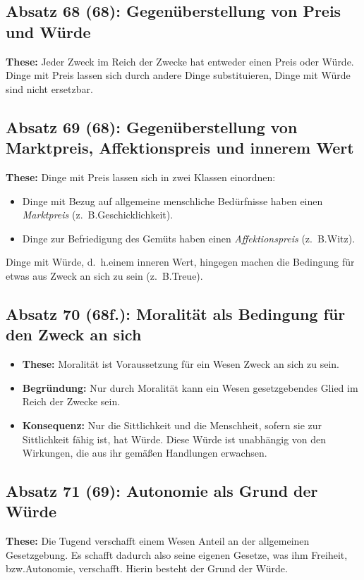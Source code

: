 \documentclass{llncs}
\begin{document}
\subsection*{Absatz 68 (68): Gegenüberstellung von Preis und Würde}

\textbf{These:} Jeder Zweck im Reich der Zwecke hat entweder einen Preis oder Würde.
Dinge mit Preis lassen sich durch andere Dinge substituieren, Dinge mit Würde sind nicht ersetzbar.

\subsection*{Absatz 69 (68): Gegenüberstellung von Marktpreis, Affektionspreis und innerem Wert}

\textbf{These:} Dinge mit Preis lassen sich in zwei Klassen einordnen:
\begin{itemize}
	\item Dinge mit Bezug auf allgemeine menschliche Bedürfnisse haben einen \textit{Marktpreis} (z.~B.\@ Geschicklichkeit).
	\item Dinge zur Befriedigung des Gemüts haben einen \textit{Affektionspreis} (z.~B.\@ Witz).
\end{itemize}
Dinge mit Würde, d.~h.\@ einem inneren Wert, hingegen machen die Bedingung für etwas aus Zweck an sich zu sein (z.~B.\@ Treue).

\subsection*{Absatz 70 (68f.): Moralität als Bedingung für den Zweck an sich}

\begin{itemize}
	\item \textbf{These:} Moralität ist Voraussetzung für ein Wesen Zweck an sich zu sein.
	\item \textbf{Begründung:} Nur durch Moralität kann ein Wesen gesetzgebendes Glied im Reich der Zwecke sein.
	\item \textbf{Konsequenz:} Nur die Sittlichkeit und die Menschheit, sofern sie zur Sittlichkeit fähig ist, hat Würde.
		Diese Würde ist unabhängig von den Wirkungen, die aus ihr gemäßen Handlungen erwachsen.
\end{itemize}

\subsection*{Absatz 71 (69): Autonomie als Grund der Würde}

\textbf{These:} Die Tugend verschafft einem Wesen Anteil an der allgemeinen Gesetzgebung.
Es schafft dadurch also seine eigenen Gesetze, was ihm Freiheit, bzw.\@ Autonomie, verschafft.
Hierin besteht der Grund der Würde.
\end{document}
